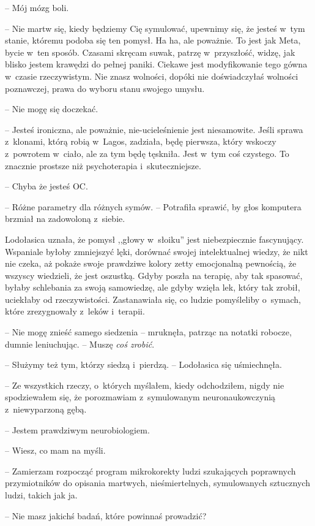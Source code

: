 \documentclass[oneside,polish,11pt,sfheadings]{mwbk}
\begin{document}
-- Mój mózg boli.

-- Nie martw się, kiedy będziemy Cię symulować, upewnimy się, że jesteś w~tym stanie, któremu podoba się ten pomysł. Ha ha, ale poważnie. To jest
jak Meta, bycie w~ten sposób. Czasami skręcam suwak, patrzę w~przyszłość, widzę, jak blisko jestem krawędzi do pełnej paniki. Ciekawe
jest modyfikowanie tego gówna w~czasie rzeczywistym. Nie znasz wolności,
dopóki nie doświadczyłaś wolności poznawczej, prawa do wyboru stanu
swojego umysłu.

-- Nie mogę się doczekać.

-- Jesteś ironiczna, ale poważnie, nie-ucieleśnienie jest niesamowite.
Jeśli sprawa z~klonami, którą robią w~Lagos, zadziała, będę pierwsza,
który wskoczy z~powrotem w~ciało, ale za tym będę tęskniła. Jest w~tym
coś czystego. To znacznie prostsze niż psychoterapia i~skuteczniejsze.

-- Chyba że jesteś OC.

-- Różne parametry dla różnych symów. -- Potrafiła sprawić, by głos
komputera brzmiał na zadowoloną z~siebie.

Lodołasica uznała, że pomysł ,,głowy w~słoiku'' jest niebezpiecznie
fascynujący. Wspaniale byłoby zmniejszyć lęki, dorównać swojej
intelektualnej wiedzy, że nikt nie czeka, aż pokaże swoje prawdziwe
kolory zetty emocjonalną pewnością, że wszyscy wiedzieli, że jest
oszustką. Gdyby poszła na terapię, aby tak spasować, byłaby schlebania
za swoją samowiedzę, ale gdyby wzięła lek, który tak zrobił, uciekłaby
od rzeczywistości. Zastanawiała się, co ludzie pomyśleliby o~symach,
które zrezygnowały z~leków i~terapii.

-- Nie mogę znieść samego siedzenia -- mruknęła, patrząc na notatki
robocze, dumnie leniuchując. -- Muszę \textit{coś zrobić}.

-- Służymy też tym, którzy siedzą i~pierdzą. -- Lodołasica się
uśmiechnęła.

-- Ze wszystkich rzeczy, o~których myślałem, kiedy odchodziłem, nigdy nie
spodziewałem się, że porozmawiam z~symulowanym neuronaukowczynią z~niewyparzoną gębą.

-- Jestem prawdziwym neurobiologiem.

-- Wiesz, co mam na myśli.

-- Zamierzam rozpocząć program mikrokorekty ludzi szukających poprawnych
przymiotników do opisania martwych, nieśmiertelnych, symulowanych
sztucznych ludzi, takich jak ja.

-- Nie masz jakichś badań, które powinnaś prowadzić?
\end{document}
